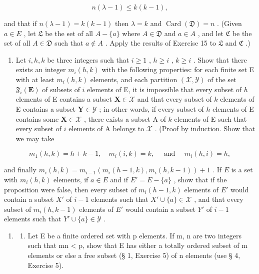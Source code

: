 \[
n (\lambda - 1) \leqslant k (k - 1),
\]

and that if \(n(\lambda - 1) = k(k - 1)\) then \(\lambda = k\) and \(\operatorname{Card}(\mathfrak{D}) = n\) . (Given \(a \in E\) , let \(\mathfrak{L}\) be the set of all \(A - \{a\}\) where \(A \in \mathfrak{D}\) and \(a \in A\) , and let \(\mathfrak{C}\) be the set of all \(A \in \mathfrak{D}\) such that \(a \notin A\) . Apply the results of Exercise 15 to \(\mathfrak{L}\) and \(\mathfrak{C}\) .)

\begin{enumerate}
\def\labelenumi{\arabic{enumi}.}
\setcounter{enumi}{16}
\tightlist
\item
  Let \(i, h, k\) be three integers such that \(i \geqslant 1\) , \(h \geqslant i\) , \(k \geqslant i\) . Show that there exists an integer \(m_i(h, k)\) with the following properties: for each finite set E with at least \(m_i(h, k)\) elements, and each partition \((\mathcal{X}, \mathcal{Y})\) of the set \(\mathfrak{F}_i(\mathbf{E})\) of subsets of \(i\) elements of E, it is impossible that every subset of \(h\) elements of E contains a subset \(\mathbf{X} \in \mathcal{X}\) and that every subset of \(k\) elements of E contains a subset \(\mathbf{Y} \in \mathcal{Y}\) ; in other words, if every subset of \(h\) elements of E contains some \(\mathbf{X} \in \mathcal{X}\) , there exists a subset A of \(k\) elements of E such that every subset of \(i\) elements of A belongs to \(\mathcal{X}\) . (Proof by induction. Show that we may take
\end{enumerate}

\[
m _ {1} (h, k) = h + k - 1, \quad m _ {i} (i, k) = k, \quad \text { and } \quad m _ {i} (h, i) = h,
\]

and finally \(m_i(h, k) = m_{i-1}(m_i(h-1, k), m_i(h, k-1)) + 1\) . If \(E\) is a set with \(m_i(h, k)\) elements, if \(a \in E\) and if \(E' = E - \{a\}\) , show that if the proposition were false, then every subset of \(m_i(h-1, k)\) elements of \(E'\) would contain a subset \(X'\) of \(i-1\) elements such that \(X' \cup \{a\} \in \mathcal{X}\) , and that every subset of \(m_i(h, k-1)\) elements of \(E'\) would contain a subset \(Y'\) of \(i-1\) elements such that \(Y' \cup \{a\} \in \mathcal{Y}\) .

\begin{enumerate}
\def\labelenumi{\arabic{enumi}.}
\setcounter{enumi}{17}
\tightlist
\item
  \begin{enumerate}
  \def\labelenumii{(\alph{enumii})}
  \tightlist
  \item
    Let E be a finite ordered set with p elements. If m, n are two integers such that mn \textless{} p, show that E has either a totally ordered subset of m elements or else a free subset (§ 1, Exercise 5) of n elements (use § 4, Exercise 5).
  \end{enumerate}
\end{enumerate}

